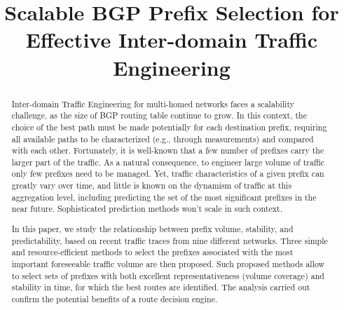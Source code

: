 \documentclass[10pt, conference,letterpaper]{IEEEtran}
\begin{document}
\title{Scalable BGP Prefix Selection for Effective Inter-domain Traffic Engineering}


\author{
\and
{}
}

\maketitle
\thispagestyle{plain}
\pagestyle{plain}

\begin{abstract}
Inter-domain Traffic Engineering for multi-homed networks faces a scalability challenge, as the size of BGP routing table continue to grow.
In this context,
the choice of the best path must be made potentially for each destination prefix, requiring all available paths to be characterized (e.g., through measurements) and compared with each other.
Fortunately, it is well-known that a few number of prefixes carry the larger part of the traffic. 
As a natural consequence, to engineer large volume of traffic only few prefixes need to be managed.
Yet, traffic characteristics of a given prefix can greatly vary over time,
and little is known on the dynamism of traffic at this aggregation level,
including predicting the set of the most significant prefixes in the near future. Sophisticated prediction methods won't scale in such context.


In this paper, we study the relationship between prefix volume, stability, and predictability, based on recent traffic traces from nine different networks.
Three simple and resource-efficient methods to select the prefixes associated with the most important foreseeable traffic volume are then proposed.
Such proposed methods
allow to select 
sets of prefixes with both excellent representativeness (volume coverage) and stability in time, for which the best routes are identified.
The analysis carried out confirm the
potential benefits of a route decision engine. 

\end{abstract}

\IEEEpeerreviewmaketitle
\end{document}
